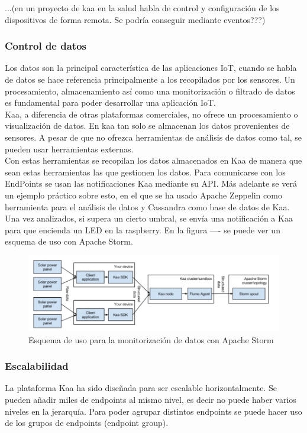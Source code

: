 \documentclass[12pt, twoside]{book}
\begin{document}
...(en un proyecto de kaa en la salud habla de control y configuración de los dispositivos de forma remota. Se podría conseguir mediante eventos???)

\subsubsection*{Control de datos}
Los datos son la principal característica de las aplicaciones IoT, cuando se habla de datos se hace referencia principalmente a los recopilados por los sensores. Un procesamiento, almacenamiento así como una monitorización o filtrado de datos es fundamental para poder desarrollar una aplicación IoT. \\ 

Kaa, a diferencia de otras plataformas comerciales, no ofrece un procesamiento o visualización de datos. En kaa tan solo se almacenan los datos provenientes de sensores. A pesar de que no ofrezca herramientas de análisis de datos como tal, se pueden usar herramientas externas. \\
Con estas herramientas se recopilan los datos almacenados en Kaa de manera que sean estas herramientas las que gestionen los datos. Para comunicarse con los EndPoints se usan las notificaciones Kaa mediante su API.
Más adelante se verá un ejemplo práctico sobre esto, en el que se ha usado Apache Zeppelin como herramienta para el análisis de datos y Cassandra como base de datos de Kaa. Una vez analizados, si supera un cierto umbral, se envía una notificación a Kaa para que encienda un LED en la raspberry.
En la figura ---- se puede ver un esquema de uso con Apache Storm.
\begin{figure}[H]
\centering
\includegraphics[scale=0.6]{images/esquema_apache}
\caption{Esquema de uso para la monitorización de datos con Apache Storm}\label{L505}
\end{figure} 

\subsubsection*{Escalabilidad}
La plataforma Kaa ha sido diseñada para ser escalable horizontalmente. Se pueden añadir miles de endpoints al mismo nivel, es decir no puede haber varios niveles en la jerarquía. Para poder agrupar distintos endpoints se puede hacer uso de los grupos de endpoints (endpoint group).
\end{document}
